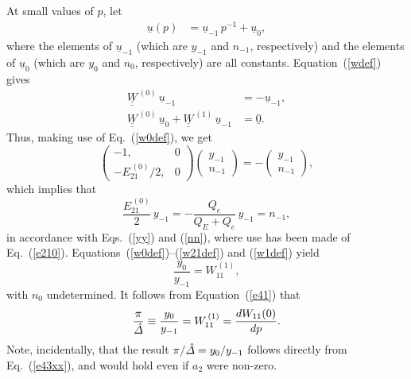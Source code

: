\documentclass[12pt,prb,aps]{revtex4-1}
\begin{document}
At small values of $p$, let
\begin{align}
\underline{u}(p) &= \underline{u}_{-1}\,p^{-1} + \underline{u}_0,
\end{align}
where the elements of  $\underline{u}_{-1}$ (which are $y_{-1}$ and $n_{-1}$, respectively) and the elements of $\underline{u}_{0}$ (which are $y_0$ 
and $n_0$, respectively) are all constants.
Equation~(\ref{wdef}) gives 
\begin{align}
\underline{\underline{W}}^{\,(0)}\,\underline{u}_{-1} &= - \underline{u}_{-1},\\[0.5ex]
\underline{\underline{W}}^{\,(0)}\,\underline{u}_{0} + \underline{\underline{W}}^{\,(1)}\,\underline{u}_{-1} &=\underline{0}.\label{w1def}
\end{align}
Thus, making use of Eq.~(\ref{w0def}), we get
\begin{equation}
\left(\begin{array}{cc} -1,&0\\ -E_{21}^{\,(0)}/2,&0\end{array}\right) \left(\begin{array}{c}y_{-1}\\ n_{-1}\end{array}\right)= -\left(\begin{array}{c}y_{-1}\\ n_{-1}\end{array}\right),
\end{equation}
which implies that
\begin{equation}
\frac{E_{21}^{\,(0)}}{2}\,y_{-1}= - \frac{Q_e}{Q_E+Q_e}\,y_{-1} = n_{-1},
\end{equation}
in accordance with Eqs.~(\ref{yy}) and (\ref{nn}), where use has been made of Eq.~(\ref{e210}). 
Equations~(\ref{w0def})--(\ref{w21def})  and (\ref{w1def})  yield
\begin{equation}
\frac{y_0}{y_{-1}}= W_{11}^{\,(1)},
\end{equation}
with $n_0$ undetermined. 
It follows from Equation~(\ref{e41}) that 
\begin{equation}\label{e111}
\frac{\pi}{\hat{\mit\Delta}}\equiv \frac{y_0}{y_{-1}} = W_{11}^{\,(1)} = \frac{dW_{11}(0)}{dp}.
\end{equation}
Note, incidentally, that the result $\pi/\hat{\mit\Delta}=y_0/y_{-1}$ follows directly from Eq.~(\ref{e43xx}), and would hold even if $a_2$ were non-zero. 
\end{document}
